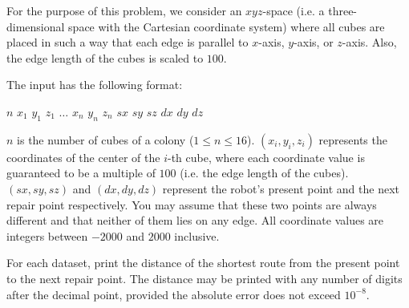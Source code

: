 \begin{problem}
For the purpose of this problem, we consider an $xyz$-space (i.e. a three-dimensional space with the Cartesian coordinate system) where all cubes are placed in such a way that each edge is parallel to $x$-axis, $y$-axis, or $z$-axis. 
Also, the edge length of the cubes is scaled to $100$.

\InputFile

The input has the following format:

\begin{InputFormat}
$n$
$x_1$ $y_1$ $z_1$
$\ldots$
$x_n$ $y_n$ $z_n$
$\mathit{sx}$ $\mathit{sy}$ $\mathit{sz}$ $\mathit{dx}$ $\mathit{dy}$ $\mathit{dz}$
\end{InputFormat}

$n$ is the number of cubes of a colony ($1 \le n \le 16$). 
$(x_i,y_i,z_i)$ represents the coordinates of the center of the $i$-th cube, where each coordinate value is guaranteed to be a multiple of $100$ (i.e. the edge length of the cubes). 
$(\mathit{sx},\mathit{sy},\mathit{sz})$ and $(\mathit{dx},\mathit{dy},\mathit{dz})$ represent the robot's present point and the next repair point respectively. 
You may assume that these two points are always different and that neither of them lies on any edge.
All coordinate values are integers between $-2000$ and $2000$ inclusive. 

\OutputFile

For each dataset, print the distance of the shortest route from the present point to the next repair point. 
The distance may be printed with any number of digits after the decimal point, provided the absolute error does not exceed $10^{-8}$.

\Examples

\begin{example}
%
%
%
%
\end{example}

\begin{example}
%
%
%
%
%
\end{example}


\end{problem}
